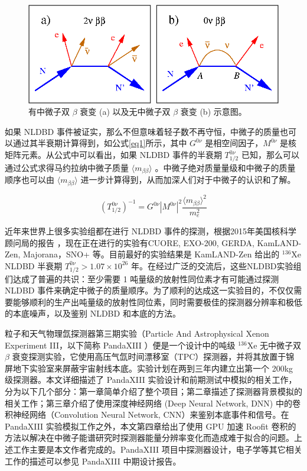 \begin{figure}
    \centering
    \includegraphics[width=0.5\columnwidth]{pic/nldbd.png}
    \caption{有中微子双 $\beta$ 衰变 (a) 以及无中微子双 $\beta$ 衰变 (b) 示意图。}
    \label{fig:nldbd}
\end{figure}

如果 NLDBD 事件被证实，那么不但意味着轻子数不再守恒，中微子的质量也可以通过其半衰期计算得到，如公式\ref{eq1}所示\supercite{avignone2008double}，其中 $G^{0\nu}$ 是相空间因子，$M^{0\nu}$ 是核矩阵元素。从公式中可以看出，如果 NLDBD 事件的半衰期 $T^{0\nu}_{1/2}$ 已知，那么可以通过公式求得马约拉纳中微子质量 $\langle m_{\beta\beta}\rangle$ 。中微子绝对质量量级和中微子的质量顺序也可以由 $\langle m_{\beta\beta}\rangle$ 进一步计算得到，从而加深人们对于中微子的认识和了解。

\begin{equation}
    (T_{1/2}^{0\nu})^{-1}=G^{0\nu}|M^{0\nu}|^2\frac{\langle m_{\beta\beta}\rangle ^2}{m_e^2}
    \label{eq1}
\end{equation}

近年来世界上很多实验组都在进行 NLDBD 事件的探测，根据2015年美国核科学顾问局的报告 \supercite{NLDBD_NSAC}，现在正在进行的实验有CUORE\supercite{Artusa:2014lgv}, EXO-200\supercite{Albert:2014awa}, GERDA\supercite{Agostini:2016iid}, KamLAND-Zen\supercite{KamLAND-Zen:2016pfg}, Majorana\supercite{Abgrall:2013rze}，SNO+\supercite{Andringa:2015tza} 等。目前最好的实验结果是 KamLAND-Zen 给出的 $^{136}$Xe NLDBD 半衰期 $T^{0\nu}_{1/2}>1.07\times10^{26}$ 年。在经过广泛的交流后，这些NLDBD实验组们达成了普遍的共识：至少需要 1 吨量级的放射性同位素才有可能通过探测 NLDBD 事件来确定中微子的质量顺序。为了顺利的达成这一实验目的，不仅仅需要能够顺利的生产出吨量级的放射性同位素，同时需要极佳的探测器分辨率和极低的本底噪声，以及鉴别 NLDBD 
和本底的方法。

粒子和天气物理氙探测器第三期实验（Particle And Astrophysical Xenon Experiment III，以下简称 PandaXIII ）便是一个设计中的吨级 $^{136}$Xe 无中微子双 $\beta$ 衰变探测实验，它使用高压气氙时间漂移室（TPC）探测器，并将其放置于锦屏地下实验室来屏蔽宇宙射线本底。实验计划在两到三年内建立出第一个 200kg 级探测器。本文详细描述了 PandaXIII 实验设计和前期测试中模拟的相关工作，分为以下几个部分：第一章简单介绍了整个项目；第二章描述了探测器背景模拟的相关工作；第三章介绍了使用深度神经网络 (Deep Neural Network, DNN) 中的卷积神经网络（Convolution Neural Network, CNN）来鉴别本底事件和信号。在 PandaXIII 实验模拟工作之外，本文第四章给出了使用 GPU 加速 Roofit 卷积的方法以解决在中微子能谱研究时探测器能量分辨率变化而造成难于拟合的问题。上述工作主要是本文作者完成的。PandaXIII 项目中探测器设计，电子学等其它相关工作的描述可以参见 PandaXIII 中期设计报告\supercite{cdr}。

